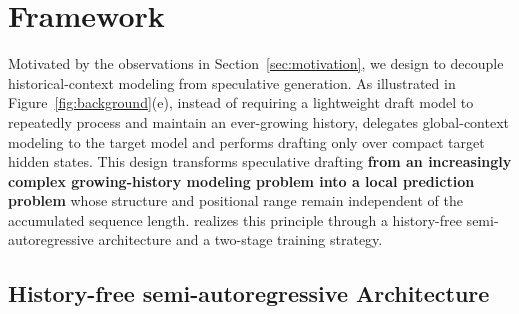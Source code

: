 

\section{\we Framework}

Motivated by the observations in Section~\ref{sec:motivation}, we design \we to decouple historical-context modeling from speculative generation. As illustrated in Figure~\ref{fig:background}(e), instead of requiring a lightweight draft model to repeatedly process and maintain an ever-growing history, \we delegates global-context modeling to the target model and performs drafting only over compact target hidden states. This design transforms speculative drafting \textbf{from an increasingly complex growing-history modeling problem into a local prediction problem} whose structure and positional range remain independent of the accumulated sequence length. \we realizes this principle through a history-free semi-autoregressive architecture and a two-stage training strategy.





\subsection{History-free semi-autoregressive Architecture} \label{sec:DLite:arch}

